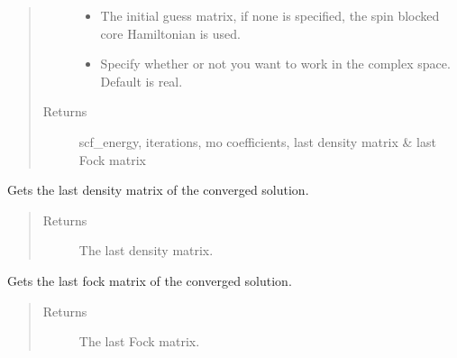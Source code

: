 \documentclass[letterpaper,10pt,english]{sphinxmanual}
\begin{document}
\begin{fulllineitems}
\begin{fulllineitems}
\begin{quote}
\begin{description}
\begin{itemize}
\item {} 
 \textendash{} The initial guess matrix, if none is specified, the spin blocked core Hamiltonian is used.

\item {} 
 \textendash{} Specify whether or not you want to work in the complex space. Default is real.

\end{itemize}

\item[{Returns}] \leavevmode
scf\_energy, iterations, mo coefficients, last density matrix \& last Fock matrix

\end{description}\end{quote}

\end{fulllineitems}


\begin{fulllineitems}
\label{\detokenize{GHF:ghf.GHF.GHF.get_last_dens}}
Gets the last density matrix of the converged solution.
\begin{quote}\begin{description}
\item[{Returns}] \leavevmode
The last density matrix.

\end{description}\end{quote}

\end{fulllineitems}


\begin{fulllineitems}
\label{\detokenize{GHF:ghf.GHF.GHF.get_last_fock}}
Gets the last fock matrix of the converged solution.
\begin{quote}\begin{description}
\item[{Returns}] \leavevmode
The last Fock matrix.

\end{description}\end{quote}


\end{fulllineitems}
\end{fulllineitems}
\end{document}
